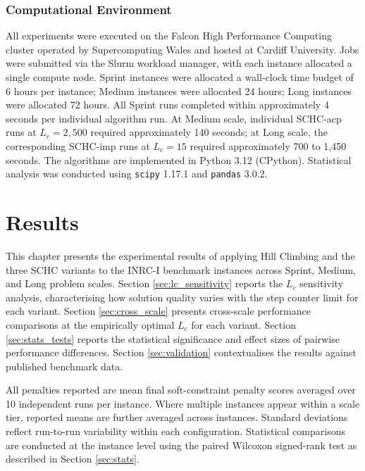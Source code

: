 \documentclass[12pt, a4paper, oneside]{report}
\begin{document}
\subsection{Computational Environment}
\label{sec:compute}

All experiments were executed on the Falcon High Performance
Computing cluster operated by Supercomputing Wales and hosted at
Cardiff University. Jobs were submitted via the Slurm workload
manager, with each instance allocated a single compute node. Sprint
instances were allocated a wall-clock time budget of 6 hours per
instance; Medium instances were allocated 24 hours; Long instances
were allocated 72 hours. All Sprint runs completed within
approximately 4 seconds per individual algorithm run. At Medium
scale, individual SCHC-acp runs at $L_c = 2{,}500$ required
approximately 140 seconds; at Long scale, the corresponding SCHC-imp
runs at $L_c = 15$ required approximately 700 to 1,450 seconds. The
algorithms are implemented in Python 3.12 (CPython). Statistical
analysis was conducted using \texttt{scipy} 1.17.1 and
\texttt{pandas} 3.0.2.

\chapter{Results}
\label{ch:results}

This chapter presents the experimental results of applying Hill
Climbing and the three SCHC variants to the INRC-I benchmark
instances across Sprint, Medium, and Long problem scales. Section
\ref{sec:lc_sensitivity} reports the $L_c$ sensitivity analysis,
characterising how solution quality varies with the step counter
limit for each variant. Section \ref{sec:cross_scale} presents
cross-scale performance comparisons at the empirically optimal $L_c$
for each variant. Section \ref{sec:stats_tests} reports the
statistical significance and effect sizes of pairwise performance
differences. Section \ref{sec:validation} contextualises the results
against published benchmark data.

All penalties reported are mean final soft-constraint penalty scores
averaged over 10 independent runs per instance. Where multiple
instances appear within a scale tier, reported means are further
averaged across instances. Standard deviations reflect run-to-run
variability within each configuration. Statistical comparisons are
conducted at the instance level using the paired Wilcoxon signed-rank
test as described in Section \ref{sec:stats}.
\end{document}
